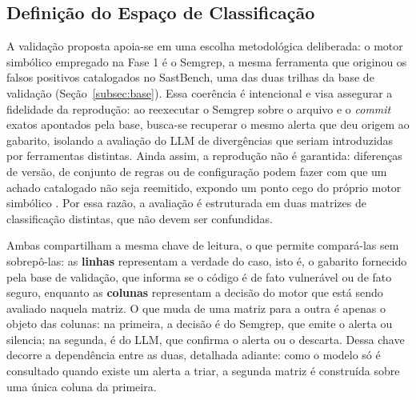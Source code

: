 \subsection{Definição do Espaço de Classificação}
\label{subsec:classificacao}
A validação proposta apoia-se em uma escolha metodológica deliberada: o motor simbólico empregado na Fase 1 é o Semgrep, a mesma ferramenta que originou os falsos positivos catalogados no SastBench, uma das duas trilhas da base de validação (Seção~\ref{subsec:base}). Essa coerência é intencional e visa assegurar a fidelidade da reprodução: ao reexecutar o Semgrep sobre o arquivo e o \textit{commit} exatos apontados pela base, busca-se recuperar o mesmo alerta que deu origem ao gabarito, isolando a avaliação do LLM de divergências que seriam introduzidas por ferramentas distintas. Ainda assim, a reprodução não é garantida: diferenças de versão, de conjunto de regras ou de configuração podem fazer com que um achado catalogado não seja reemitido, expondo um ponto cego do próprio motor simbólico \cite{bennett2024semgrep}. Por essa razão, a avaliação é estruturada em duas matrizes de classificação distintas, que não devem ser confundidas.

Ambas compartilham a mesma chave de leitura, o que permite compará-las sem sobrepô-las: as \textbf{linhas} representam a verdade do caso, isto é, o gabarito fornecido pela base de validação, que informa se o código é de fato vulnerável ou de fato seguro, enquanto as \textbf{colunas} representam a decisão do motor que está sendo avaliado naquela matriz. O que muda de uma matriz para a outra é apenas o objeto das colunas: na primeira, a decisão é do Semgrep, que emite o alerta ou silencia; na segunda, é do LLM, que confirma o alerta ou o descarta. Dessa chave decorre a dependência entre as duas, detalhada adiante: como o modelo só é consultado quando existe um alerta a triar, a segunda matriz é construída sobre uma única coluna da primeira.


